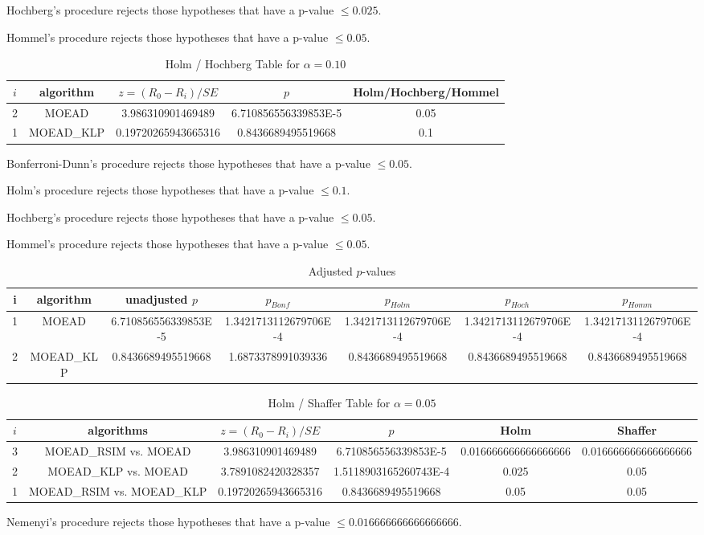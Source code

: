 \documentclass[a4paper,10pt]{article}
\begin{document}
\begin{landscape}
Hochberg's procedure rejects those hypotheses that have a p-value $\le0.025$.


Hommel's procedure rejects those hypotheses that have a p-value $\le0.05$.


\begin{table}[!htp]
\centering\tiny
\caption{Holm / Hochberg Table for $\alpha=0.10$}
\begin{tabular}{ccccc}
$i$&algorithm&$z=(R_0 - R_i)/SE$&$p$&Holm/Hochberg/Hommel\\
\hline
2&MOEAD&3.986310901469489&6.710856556339853E-5&0.05\\
1&MOEAD_KLP&0.19720265943665316&0.8436689495519668&0.1\\
\hline
\end{tabular}
\end{table}
Bonferroni-Dunn's procedure rejects those hypotheses that have a p-value $\le0.05$.


Holm's procedure rejects those hypotheses that have a p-value $\le0.1$.


Hochberg's procedure rejects those hypotheses that have a p-value $\le0.05$.


Hommel's procedure rejects those hypotheses that have a p-value $\le0.05$.


\begin{table}[!htp]
\centering\tiny
\caption{Adjusted $p$-values}
\begin{tabular}{ccccccc}
i&algorithm&unadjusted $p$&$p_{Bonf}$&$p_{Holm}$&$p_{Hoch}$&$p_{Homm}$\\
\hline
1&MOEAD&6.710856556339853E-5&1.3421713112679706E-4&1.3421713112679706E-4&1.3421713112679706E-4&1.3421713112679706E-4\\
2&MOEAD_KLP&0.8436689495519668&1.6873378991039336&0.8436689495519668&0.8436689495519668&0.8436689495519668\\
\hline
\end{tabular}
\end{table}

\begin{table}[!htp]
\centering\tiny
\caption{Holm / Shaffer Table for $\alpha=0.05$}
\begin{tabular}{cccccc}
$i$&algorithms&$z=(R_0 - R_i)/SE$&$p$&Holm&Shaffer\\
\hline
3&MOEAD_RSIM vs. MOEAD&3.986310901469489&6.710856556339853E-5&0.016666666666666666&0.016666666666666666\\
2&MOEAD_KLP vs. MOEAD&3.7891082420328357&1.5118903165260743E-4&0.025&0.05\\
1&MOEAD_RSIM vs. MOEAD_KLP&0.19720265943665316&0.8436689495519668&0.05&0.05\\
\hline
\end{tabular}
\end{table}
Nemenyi's procedure rejects those hypotheses that have a p-value $\le0.016666666666666666$.



\end{landscape}
\end{document}
